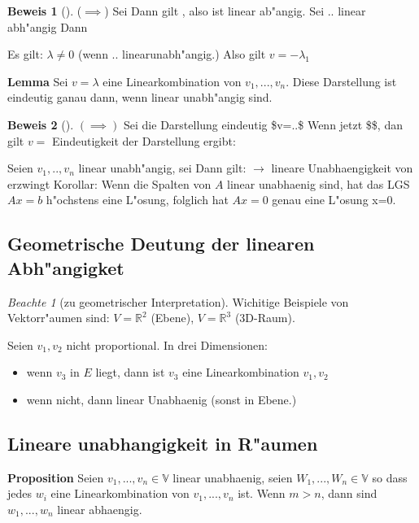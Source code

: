\documentclass[11pt]{article}
\theoremstyle{remark}
\newtheorem*{notte}{Beachte}
\theoremstyle{definition}
\newtheorem{prof}{Beweis}
\theoremstyle{remark}
\begin{document}
\begin{prof}[] \label{}
(\(\implies\)) Sei Dann gilt , also ist linear ab"angig.
Sei .. linear abh"angig  Dann 

Es gilt: \(\lambda \not= 0\) (wenn  .. linearunabh"angig.) Also gilt \(v=-\lambda_1\)
\end{prof}

\textbf{Lemma} Sei \(v=\lambda\) eine Linearkombination von \(v_1,...,v_n\). Diese
Darstellung ist eindeutig ganau dann, wenn linear unabh"angig sind.

\begin{prof}[] \label{}
\((\implies)\) Sei die Darstellung eindeutig \$v=..\$ Wenn jetzt \$\$, dan gilt \(v=\)
Eindeutigkeit der Darstellung ergibt:

Seien \(v_1,..,v_n\) linear unabh"angig, sei 
Dann gilt: \(\rightarrow\) lineare Unabhaengigkeit von erzwingt Korollar: Wenn die
Spalten von \(A\) linear unabhaenig sind, hat das LGS \(Ax=b\) h"ochstens eine
L"osung, folglich hat \(Ax=0\) genau eine L"osung x=0.
\end{prof}

\subsection{Geometrische Deutung der linearen Abh"angigket}
\label{sec:org95b9a1d}
\begin{notte}[zu geometrischer Interpretation] \label{}
Wichitige Beispiele von Vektorr"aumen sind: \(V=\mathbb{R}^2\) (Ebene),
\(V=\mathbb{R}^3\) (3D-Raum).
\end{notte}

Seien \(v_1, v_2\) nicht proportional.
In drei Dimensionen:
\begin{relation}
\begin{itemize}
\item wenn \(v_3\) in \(E\) liegt, dann ist \(v_3\) eine Linearkombination \(v_1, v_2\)
\item wenn nicht, dann linear Unabhaenig (sonst in Ebene.)
\end{itemize}
\end{relation}

\subsection{Lineare unabhangigkeit in R"aumen}
\label{sec:orgea5b4b9}
\textbf{Proposition} Seien \(v_1,...,v_n \in \mathbb{V}\) linear unabhaenig, seien \(W_1,
..., W_n \in \mathbb{V}\) so dass jedes \(w_i\) eine Linearkombination von
\(v_1,...,v_n\) ist. Wenn \(m>n\), dann sind \(w_1,...,w_n\) linear abhaengig.
\end{document}
